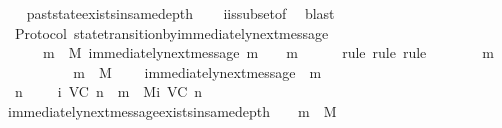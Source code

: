 \begin{isabellebody}
\ \ \isamarkupfalse%
\ past{\isacharunderscore}state{\isacharunderscore}exists{\isacharunderscore}in{\isacharunderscore}same{\isacharunderscore}depth\isanewline
\ \ \isamarkupfalse%
\ {\isasymSigma}i{\isacharunderscore}is{\isacharunderscore}subset{\isacharunderscore}of{\isacharunderscore}{\isasymSigma}\ \isamarkupfalse%
\ blast%
\endisatagproof
{\isafoldproof}%
%
\isadelimproof
\isanewline
%
\endisadelimproof
\isanewline
{}\isamarkupfalse%
\ {\isacharparenleft}\ Protocol{\isacharparenright}\ state{\isacharunderscore}transition{\isacharunderscore}by{\isacharunderscore}immediately{\isacharunderscore}next{\isacharunderscore}message{\isacharcolon}\ \isanewline
\ \ {\isachardoublequoteopen}{\isasymforall}\ {\isasymsigma}\ {\isasymin}{\isasymSigma}{\isachardot}\ {\isasymforall}\ m\ {\isasymin}\ M{\isachardot}\ immediately{\isacharunderscore}next{\isacharunderscore}message\ {\isacharparenleft}{\isasymsigma}{\isacharcomma}m{\isacharparenright}\ {\isasymlongrightarrow}\ {\isasymsigma}\ {\isasymunion}\ {\isacharbraceleft}m{\isacharbraceright}\ {\isasymin}\ {\isasymSigma}{\isachardoublequoteclose}\isanewline
%
\isadelimproof
\ \ %
\endisadelimproof
%
\isatagproof
{}\isamarkupfalse%
\ {\isacharparenleft}rule{\isacharcomma}\ rule{\isacharcomma}\ rule{\isacharparenright}\isanewline
{}\isamarkupfalse%
\ {\isacharminus}\ \isanewline
\ \ \isamarkupfalse%
\ {\isasymsigma}\ m\isanewline
\ \ \isamarkupfalse%
\ {\isachardoublequoteopen}{\isasymsigma}\ {\isasymin}\ {\isasymSigma}{\isachardoublequoteclose}\ \isanewline
\ \ \ {\isachardoublequoteopen}m\ {\isasymin}\ M{\isachardoublequoteclose}\ \isanewline
\ \ \ {\isachardoublequoteopen}immediately{\isacharunderscore}next{\isacharunderscore}message\ {\isacharparenleft}{\isasymsigma}{\isacharcomma}\ m{\isacharparenright}{\isachardoublequoteclose}\ \isanewline
\ \ \isamarkupfalse%
\ \isamarkupfalse%
\ {\isachardoublequoteopen}{\isacharparenleft}{\isasymexists}\ n\ {\isasymin}\ {\isasymnat}{\isachardot}\ {\isasymsigma}\ {\isasymin}\ {\isasymSigma}i\ {\isacharparenleft}V{\isacharcomma}C{\isacharcomma}{\isasymepsilon}{\isacharparenright}\ n\ {\isasymand}\ m\ {\isasymin}\ Mi\ {\isacharparenleft}V{\isacharcomma}C{\isacharcomma}{\isasymepsilon}{\isacharparenright}\ n{\isacharparenright}{\isachardoublequoteclose}\isanewline
\ \ \ \ \isamarkupfalse%
\ immediately{\isacharunderscore}next{\isacharunderscore}message{\isacharunderscore}exists{\isacharunderscore}in{\isacharunderscore}same{\isacharunderscore}depth\ {\isacartoucheopen}{\isasymsigma}\ {\isasymin}\ {\isasymSigma}{\isacartoucheclose}\ {\isacartoucheopen}m\ {\isasymin}\ M{\isacartoucheclose}\isanewline

\end{isabellebody}
